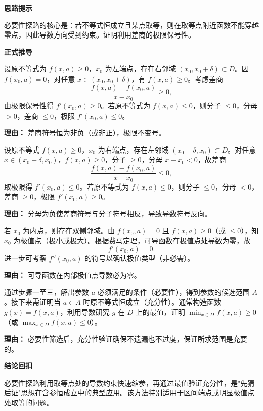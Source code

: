 \begin{proofbox}
	\textbf{\textcolor{CProof}{思路提示}}

	必要性探路的核心是：若不等式恒成立且某点取等，则在取等点附近函数不能穿越零点，因此导数方向受到约束。证明利用差商的极限保号性。

	\medskip
	\textbf{\textcolor{CProof}{正式推导}}
	\begin{description}[style=nextline, leftmargin=2.8em, labelsep=0.5em, itemsep=0.55em]
		\item[\textbf{步骤一（端点左端条件）：}] 设原不等式为 $f(x,a)\ge 0$，$x_0$ 为左端点，存在右邻域 $(x_0,x_0+\delta)\subset D$。因 $f(x_0,a)=0$，对任意 $x\in (x_0,x_0+\delta)$，有 $f(x,a)\ge 0$。考虑差商
			\[
				\frac{f(x,a)-f(x_0,a)}{x-x_0}\ge 0,
			\]
			由极限保号性得 $f'(x_0,a)\ge 0$。若原不等式为 $f(x,a)\le 0$，则分子 $\le 0$，分母 $>0$，差商 $\le 0$，极限 $f'(x_0,a)\le 0$。
			\par\textbf{理由：} 差商符号恒为非负（或非正），极限不变号。

		\item[\textbf{步骤二（端点右端条件）：}] 设原不等式 $f(x,a)\ge 0$，$x_0$ 为右端点，存在左邻域 $(x_0-\delta,x_0)\subset D$。对任意 $x\in (x_0-\delta,x_0)$，$f(x,a)\ge 0$，分子 $\ge 0$，分母 $x-x_0<0$，故差商
			\[
				\frac{f(x,a)-f(x_0,a)}{x-x_0}\le 0,
			\]
			取极限得 $f'(x_0,a)\le 0$。若原不等式为 $f(x,a)\le 0$，则分子 $\le 0$，分母 $<0$，差商 $\ge 0$，极限 $f'(x_0,a)\ge 0$。
			\par\textbf{理由：} 分母为负使差商符号与分子符号相反，导致导数符号反向。

		\item[\textbf{步骤三（内点导数归零）：}] 若 $x_0$ 为内点，则存在双侧邻域。由 $f(x_0,a)=0$ 且 $f(x,a)\ge 0$（或 $\le 0$），知 $x_0$ 为极值点（极小或极大）。根据费马定理，可导函数在极值点处导数为零，故
			\[
				f'(x_0,a)=0.
			\]
			进一步可考察 $f''(x_0,a)$ 的符号以确认极值类型（非必需）。
			\par\textbf{理由：} 可导函数在内部极值点导数必为零。

		\item[\textbf{步骤四（充分性验证）：}] 通过步骤一至三，解出参数 $a$ 必须满足的条件（必要性），得到参数的候选范围 $A$。接下来需证明当 $a\in A$ 时原不等式恒成立（充分性）。通常构造函数 $g(x)=f(x,a)$，利用导数研究 $g$ 在 $D$ 上的最值，证明 $\min_{x\in D} f(x,a) \ge 0$（或 $\max_{x\in D} f(x,a) \le 0$）。
			\par\textbf{理由：} 必要性筛选后，充分性验证确保不遗漏也不过度，保证所求范围是充要的。
	\end{description}

	\medskip
	\textbf{\textcolor{CProof}{结论回扣}}

	必要性探路利用取等点处的导数约束快速缩参，再通过最值验证充分性，是"先猜后证"思想在含参恒成立中的典型应用。该方法特别适用于区间端点或明显极值点处取等的问题。
\end{proofbox}
